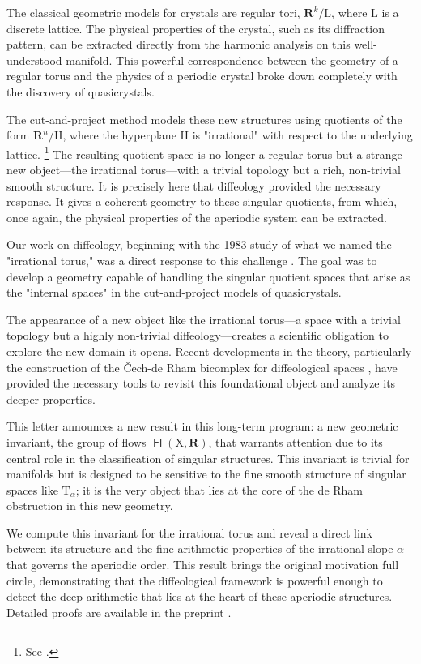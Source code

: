 \documentclass[10pt,letterpaper,reqno]{amsart}
\newcommand{\RR}{\mathbf{R}}
\newcommand{\T}{\mathrm{T}}
\renewcommand{\H}{\mathrm{H}}
\renewcommand{\L}{\mathrm{L}}
\newcommand{\X}{\mathrm{X}}
\DeclareMathOperator{\Fb}{\boldsymbol{\mathsf{Fl}}}
\begin{document}
  The classical geometric models for crystals are regular tori, $\RR^k/\L$, where $\L$ is a discrete lattice. The physical properties of the crystal, such as its diffraction pattern, can be extracted directly from the harmonic analysis on this well-understood manifold. This powerful correspondence between the geometry of a regular torus and the physics of a periodic crystal broke down completely with the discovery of quasicrystals.
  
  The cut-and-project method models these new structures using quotients of the form $\RR^n/\H$, where the hyperplane $\H$ is "irrational" with respect to the underlying lattice.%
  \footnote{See \cite{IZL90}.}
  The resulting quotient space is no longer a regular torus but a strange new object---the irrational torus---with a trivial topology but a rich, non-trivial smooth structure. It is precisely here that diffeology provided the necessary response. It gives a coherent geometry to these singular quotients, from which, once again, the physical properties of the aperiodic system can be extracted.
  
  Our work on diffeology, beginning with the 1983 study of what we named the "irrational torus," was a direct response to this challenge \cite{DIZ83}. The goal was to develop a geometry capable of handling the singular quotient spaces that arise as the "internal spaces" in the cut-and-project models of quasicrystals.
  
  The appearance of a new object like the irrational torus---a space with a trivial topology but a highly non-trivial diffeology---creates a scientific obligation to explore the new domain it opens. Recent developments in the theory, particularly the construction of the Čech-de Rham bicomplex for diffeological spaces \cite{PIZ24}, have provided the necessary tools to revisit this foundational object and analyze its deeper properties.
  
  This letter announces a new result in this long-term program:
  a new geometric invariant,
  the group of flows $\Fb(\X, \RR)$,
  that warrants attention due to its central role in the classification of singular structures.
  This invariant is trivial for manifolds but is designed to be sensitive to the fine smooth structure of singular spaces like $\T_\alpha$;
  it is the very object that lies at the core of the de Rham obstruction in this new geometry.
  
  We compute this invariant for the irrational torus and reveal a direct link between its structure and the fine arithmetic properties of the irrational slope $\alpha$ that governs the aperiodic order. This result brings the original motivation full circle, demonstrating that the diffeological framework is powerful enough to detect the deep arithmetic that lies at the heart of these aperiodic structures. Detailed proofs are available in the preprint \cite{PIZ25a}.
  
\end{document}
